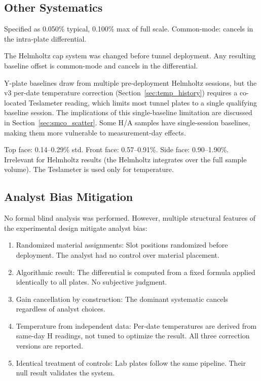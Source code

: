 \documentclass[11pt,letterpaper]{article}
\begin{document}
\subsection{Other Systematics}

\begin{description}[style=nextline]
    \item[Helmholtz DC accuracy]
    Specified as 0.050\% typical, 0.100\% max of full scale. Common-mode:
    cancels in the intra-plate differential.

    \item[Cap/rig changes]
    The Helmholtz cap system was changed before tunnel deployment. Any resulting
    baseline offset is common-mode and cancels in the differential.

    \item[Baseline robustness]
    Y-plate baselines draw from multiple pre-deployment Helmholtz sessions,
    but the v3 per-date temperature correction
    (Section~\ref{sec:temp_history}) requires a co-located Teslameter
    reading, which limits most tunnel plates to a single qualifying baseline
    session.  The implications of this single-baseline limitation are
    discussed in Section~\ref{sec:smco_scatter}.
    Some H/A samples have single-session baselines, making them more vulnerable
    to measurement-day effects.

    \item[Teslameter positioning noise]
    Top face: 0.14--0.29\% std. Front face: 0.57--0.91\%. Side face:
    0.90--1.90\%. Irrelevant for Helmholtz results (the Helmholtz integrates
    over the full sample volume). The Teslameter is used only for temperature.
\end{description}

\subsection{Analyst Bias Mitigation}
\label{sec:bias}

No formal blind analysis was performed. However, multiple structural features
of the experimental design mitigate analyst bias:

\begin{enumerate}
    \item Randomized material assignments: Slot positions randomized
    before deployment. The analyst had no control over material placement.
    \item Algorithmic result: The differential is computed from a
    fixed formula applied identically to all plates. No subjective judgment.
    \item Gain cancellation by construction: The dominant systematic
    cancels regardless of analyst choices.
    \item Temperature from independent data: Per-date temperatures
    are derived from same-day H readings, not tuned to optimize the result.
    All three correction versions are reported.
    \item Identical treatment of controls: Lab plates follow the
    same pipeline. Their null result validates the system.
\end{enumerate}
\end{document}

